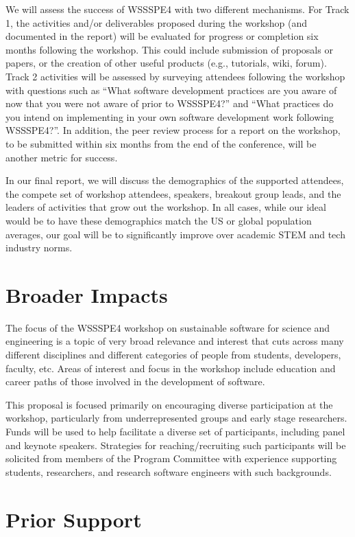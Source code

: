 \documentclass[11pt]{article}
\begin{document}
We will assess the success of WSSSPE4 with two different mechanisms.
For Track 1, the activities and\slash or deliverables proposed during the workshop (and documented in the report) will be evaluated for progress or completion six months following the workshop.
This could include submission of proposals or papers, or the creation of other useful products (e.g., tutorials, wiki, forum).
Track 2 activities will be assessed by surveying attendees following the workshop with questions such as ``What software development practices are you aware of now that you were not aware of prior to WSSSPE4?'' and ``What practices do you intend on implementing in your own software development work following WSSSPE4?''.
In addition, the peer review process for a report on the workshop, to be submitted within six months from the end of the conference, will be another metric for success.

In our final report, we will discuss the demographics of the supported attendees, the compete set of workshop attendees, speakers, breakout group leads, and the leaders of activities that grow out the workshop. In all cases, while our ideal would be to have these demographics match the US or global population averages, our goal will be to significantly improve over academic STEM and tech industry norms.

\section{Broader Impacts} 

The focus of the WSSSPE4 workshop on sustainable software for science and engineering is a topic of very broad relevance and interest that cuts across many different disciplines and different categories of people from students, developers, faculty, etc. Areas of interest and focus in the workshop include education and career paths of those involved in the development of software.

This proposal is focused primarily on encouraging diverse participation at the workshop, particularly from underrepresented groups and early stage researchers. Funds will be used to help facilitate a diverse set of participants, including panel and keynote speakers. 
Strategies for reaching\slash recruiting such participants will be solicited from members of the Program Committee with experience supporting students, researchers, and research software engineers with such backgrounds.

\section{Prior Support} 
\end{document}
